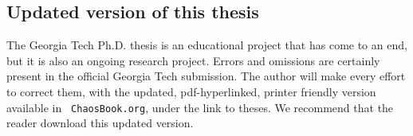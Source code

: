 \subsection{Updated version of this thesis}

The Georgia Tech Ph.D. thesis is an educational project that
has come to an end, but it is also an ongoing research
project. Errors and omissions are certainly present in
the official Georgia Tech submission. The author will make
every effort to correct them, with the updated,
pdf-hyperlinked, printer friendly version available in {\tt
ChaosBook.org}, under the link to theses. We recommend
that the reader download this updated version.
